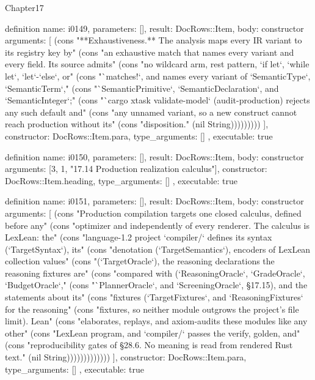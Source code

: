 \begin{lexlean}{Chapter17}
\begin{semanticmodule}
definition{
  name: i0149,
  parameters: [],
  result: DocRows::Item,
  body: constructor{
    arguments: [
      (cons "**Exhaustiveness.** The analysis maps every IR variant to its registry key by" (cons "an exhaustive match that names every variant and every field. Its source admits" (cons "no wildcard arm, rest pattern, `if let`, `while let`, `let`-`else`, or" (cons "`matches!`, and names every variant of `SemanticType`, `SemanticTerm`," (cons "`SemanticPrimitive`, `SemanticDeclaration`, and `SemanticInteger`;" (cons "`cargo xtask validate-model` (audit-production) rejects any such default and" (cons "any unnamed variant, so a new construct cannot reach production without its" (cons "disposition." (nil String)))))))))
    ],
    constructor: DocRows::Item.para,
    type_arguments: []
  },
  executable: true
}

definition{
  name: i0150,
  parameters: [],
  result: DocRows::Item,
  body: constructor{
    arguments: [3, 1, "17.14 Production realization calculus"],
    constructor: DocRows::Item.heading,
    type_arguments: []
  },
  executable: true
}

definition{
  name: i0151,
  parameters: [],
  result: DocRows::Item,
  body: constructor{
    arguments: [
      (cons "Production compilation targets one closed calculus, defined before any" (cons "optimizer and independently of every renderer. The calculus is LexLean: the" (cons "language-1.2 project `compiler/` defines its syntax (`TargetSyntax`), its" (cons "denotation (`TargetSemantics`), encoders of LexLean collection values" (cons "(`TargetOracle`), the reasoning declarations the reasoning fixtures are" (cons "compared with (`ReasoningOracle`, `GradeOracle`, `BudgetOracle`," (cons "`PlannerOracle`, and `ScreeningOracle`, §17.15), and the statements about its" (cons "fixtures (`TargetFixtures`, and `ReasoningFixtures` for the reasoning" (cons "fixtures, so neither module outgrows the project's file limit). Lean" (cons "elaborates, replays, and axiom-audits these modules like any other" (cons "LexLean program, and `compiler/` passes the verify, golden, and" (cons "reproducibility gates of §28.6. No meaning is read from rendered Rust text." (nil String)))))))))))))
    ],
    constructor: DocRows::Item.para,
    type_arguments: []
  },
  executable: true
}


\end{semanticmodule}
\end{lexlean}
